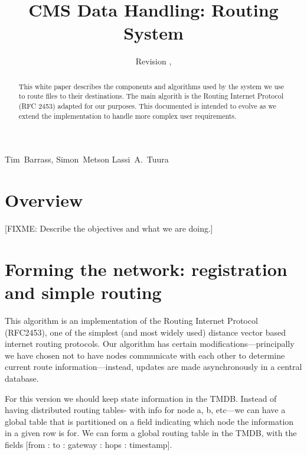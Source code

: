 \documentclass{cmspaper}
\begin{document}
\begin{titlepage}
  \whitepaper
  \date{Revision \RCSRevision, \RCSDate}
  \title{CMS Data Handling: Routing System}

  \begin{Authlist}
    Tim~Barrass, Simon~Metson
    Lassi~A.~Tuura
  \end{Authlist}

  \begin{abstract}
    This white paper describes the components and algorithms used by
    the system we use to route files to their destinations.  The main
    algorith is the Routing Internet Protocol (RFC 2453) adapted for
    our purposes.  This documented is intended to evolve as we extend
    the implementation to handle more complex user requirements.
  \end{abstract} 

\end{titlepage}

\setcounter{page}{2}

\section{Overview}

[FIXME: Describe the objectives and what we are doing.]

\section{Forming the network: registration and simple routing}

This algorithm is an implementation of the Routing Internet Protocol
(RFC2453), one of the simplest (and most widely used) distance vector
based internet routing protocols. Our algorithm has certain
modifications---principally we have chosen not to have nodes
communicate with each other to determine current route
information---instead, updates are made asynchronously in a central
database.

For this version we should keep state information in the TMDB.
Instead of having distributed routing tables- with info for node a, b,
etc---we can have a global table that is partitioned on a field
indicating which node the information in a given row is for. We can
form a global routing table in the TMDB, with the fields [from : to :
gateway : hops : timestamp].
\end{document}
